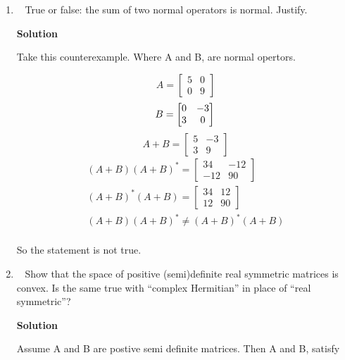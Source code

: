 \documentclass[11pt]{article}
\makeatletter
\newcommand\score[1]{\marginpar{\vspace{-2ex}\color{blue}{#1/3}}\hspace{-1ex}}
\newcommand\0{\mathbf{0}}
\newcommand\<{\langle}
\renewcommand\>{\rangle}
\newcommand\twobytwo[1]{\left[\begin{array}{@{}cc@{}}#1\end{array}\right]}
\makeatother
\begin{document}
\begin{enumerate}
\begin{align*}
  \psi (v)&= v^{'} \text{\; By Defintion.}\\ 
  \psi^{*}(v^{'})&=v \text{\; Because }\varphi^{*}=\varphi^{-1}
\end{align*}

So make the block matrix 
$$%
  \twobytwo{ \0  & -\psi^*
          \\ \psi &    \0 }
$$%

Which takes $x=w+w^{'}$ to $w' - w$, and $w' - w$ to $ -w' - w$, which satisifies
the original function.

\item\ \score{}%
True or false: the sum of two normal operators is normal.  Justify.

\textbf{Solution}

Take this counterexample. Where A and B, are normal opertors.   

$$
A=
\begin{bmatrix}
  5& 0\\
  0& 9
\end{bmatrix}
$$
$$
B=
\begin{bmatrix}
  0& -3\\
  3& 0
\end{bmatrix}\\
$$
$$
A+B=
\begin{bmatrix}
5&-3\\
3&9
\end{bmatrix}
$$
\begin{align*}
  (A+B)(A+B)^{*}=
  \begin{bmatrix}
    34& -12\\
    -12& 90
  \end{bmatrix}\\
  (A+B)^{*}(A+B)=
  \begin{bmatrix}
  34& 12\\
  12& 90
\end{bmatrix}    \\
 (A+B)(A+B)^{*}\neq(A+B)^{*}(A+B)\\
\end{align*}

So the statement is not true.
\item\ \score{}%
Show that the space of positive (semi)definite real symmetric
matrices is convex.  Is the same true with ``complex Hermitian'' in
place of ``real symmetric''?

\textbf{Solution}

Assume A and B are postive semi definite matrices. Then A and B, satisfy


\end{enumerate}
\end{document}
